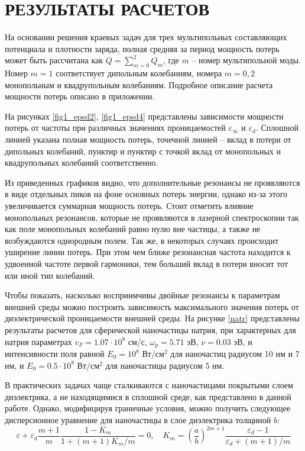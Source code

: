 \documentclass[12pt, a4paper]{article}
\def \eps {\varepsilon}
\def \w {\omega}
\begin{document}
\section{РЕЗУЛЬТАТЫ РАСЧЕТОВ}
На основании решения краевых задач для трех мультипольных составляющих потенциала и плотности заряда, полная средняя за период мощность потерь может быть рассчитана как $Q = \sum_{m=0}^2 Q_m$, где $m$ -- номер мультипольной моды. Номер $m=1$ соответствует дипольным колебаниям, номера $m=0,2$ монопольным и квадрупольным колебаниям. Подробное описание расчета мощности потерь описано в приложении. 

На рисунках \ref{fig1_epsd2}, \ref{fig1_epsd4} представлены зависимости мощности потерь от частоты при различных значениях проницаемостей $\eps_\infty$ и $\eps_d$. Сплошной линией указана полная мощность потерь, точечной линией – вклад в потери от дипольных колебаний, пунктир и пунктир с точкой вклад от монопольных и квадрупольных колебаний соответственно. 

Из приведенных графиков видно, что дополнительные резонансы не проявляются в виде отдельных пиков на фоне основных потерь энергии, однако из-за этого увеличивается суммарная мощность потерь. Стоит отметить влияние монопольных резонансов, которые не проявляются в лазерной спектроскопии так как поле монопольных колебаний равно нулю вне частицы, а также не возбуждаются однородным полем. Так же, в некоторых случаях происходит уширение линии потерь. При этом чем ближе резонансная частота находится к удвоенной частоте первой гармоники, тем больший вклад в потери вносит тот или иной тип колебаний.

Чтобы показать, насколько восприимчивы двойные резонансы к параметрам внешней среды можно построить зависимость максимального значения потерь от диэлектрической проницаемости внешней среды. На рисунке \ref{natr} представлены результаты расчетов для сферической наночастицы натрия, при характерных для натрия параметрах $v_F = 1.07\cdot10^8$ см/с, $\w_p = 5.71$ эВ, $\nu = 0.03$ эВ, и интенсивности поля равной $E_0=10^8$ $\text{Вт}/\text{см}^2$ для наночастиц радиусом 10 нм и 7 нм, и $E_0=0.5 \cdot 10^8$ $\text{Вт}/\text{см}^2$ для наночастицы радиусом 5 нм.

В практических задачах чаще сталкиваются с наночастицами покрытыми слоем диэлектрика, а не находящимися в сплошной среде, как представлено в данной работе. Однако, модифицируя граничные условия, можно получить следующее дисперсионное уравнение для наночастицы в слое диэлектрика толщиной $b$:
\begin{equation} 	
	\eps + \eps_d\frac{m+1}{m}  \frac{1-K_m}{1 + (m+1)K_m/m} = 0, \quad K_m = (\frac{a}{b})^{2m+1} \frac{\eps_d - 1}{\eps_d + (m+1)/m}
\end{equation}
\end{document}
